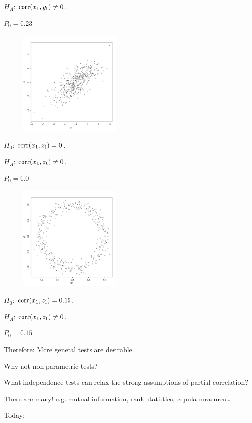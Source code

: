 $H_A$: $\operatorname*{corr}(x_1, y_1)\ne0$.

$P_0 = 0.23$

\clearpage
\begin{figure}
  \begin{center}
    \includegraphics[width=5cm]{x1_vs_z1.pdf}
  \end{center}
\end{figure}
$H_0$: $\operatorname*{corr}(x_1, z_1)=0$.

$H_A$: $\operatorname*{corr}(x_1, z_1)\ne0$.

$P_0 = 0.0$
\clearpage
\begin{figure}
  \begin{center}
    \includegraphics[width=5cm]{x2_vs_y2.pdf}
  \end{center}
\end{figure}
$H_0$: $\operatorname*{corr}(x_1, z_1)=0.15$.

$H_A$: $\operatorname*{corr}(x_1, z_1)\ne0$.

$P_0 = 0.15$
\clearpage

Therefore: More general tests are desirable.

Why not non-parametric tests?

\clearpage

What independence tests can relax the strong assumptions of partial correlation?

There are many! e.g. mutual information, rank statistics, copula measures\ldots

\clearpage
Today:

